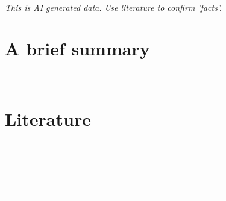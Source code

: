 \documentclass{article}
\begin{document}
\vspace*{-10pt}
\begin{center}
	{\Huge \scshape {}}\\
    \textit{This is AI generated data. Use literature to confirm 'facts'.}\\
\end{center}


\section{A brief summary}
\\
\vspace{1mm}

\section{Literature}
 - \textit{}\\
\vspace{1mm}

    \section{}
    \\
    \vspace{3mm}
        \textbf{} - \textit{}\\
\end{document}
